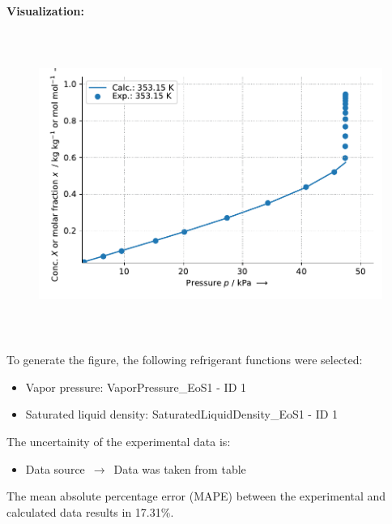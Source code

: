 \textbf{Visualization:}
%
\begin{figure}[!htp]
{\noindent\includegraphics[height=10cm, keepaspectratio]{figs/abs/abs_Water_ionic_liquid_[EMIM]+[(CF3SO2)2N]-_NrtlFixedDg_1.pdf}}
\end{figure}
%

To generate the figure, the following refrigerant functions were selected:
\begin{itemize}
\item Vapor pressure: VaporPressure\_EoS1 - ID 1
\item Saturated liquid density: SaturatedLiquidDensity\_EoS1 - ID 1
\end{itemize}

The uncertainity of the experimental data is:
\begin{itemize}
\item Data source $\,\to\,$ Data was taken from table
\end{itemize}

The mean absolute percentage error (MAPE) between the experimental and calculated data results in 17.31\%.
\FloatBarrier
\newpage
